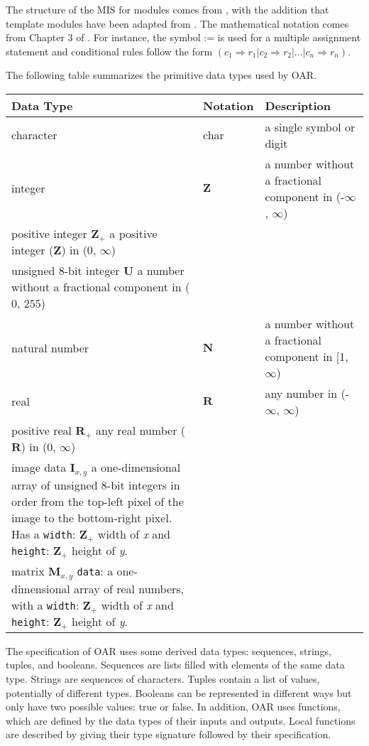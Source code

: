 \documentclass[12pt, titlepage]{article}
\def\code#1{\texttt{#1}}
\begin{document}

The structure of the MIS for modules comes from \citet{HoffmanAndStrooper1995},
with the addition that template modules have been adapted from
\cite{GhezziEtAl2003}.  The mathematical notation comes from Chapter 3 of
\citet{HoffmanAndStrooper1995}.  For instance, the symbol := is used for a
multiple assignment statement and conditional rules follow the form $(c_1
\Rightarrow r_1 | c_2 \Rightarrow r_2 | ... | c_n \Rightarrow r_n )$.

The following table summarizes the primitive data types used by OAR. 

\begin{center}
\renewcommand{\arraystretch}{1.2}
\noindent 
\begin{tabular}{l l p{7.5cm}} 
\toprule 
\textbf{Data Type} & \textbf{Notation} & \textbf{Description}\\ 
\midrule
character & char & a single symbol or digit\\
integer & $\mathbf{Z}$ & a number without a fractional component in (-$\infty$, $\infty$) \\
positive integer $\mathbf{Z}_{+}$ a positive integer ($\mathbf{Z}$) in ($0$, $\infty$) \\
unsigned 8-bit integer $\mathbf{U}$ a number without a fractional component in ($0$, $255$) \\
natural number & $\mathbf{N}$ & a number without a fractional component in [1, $\infty$) \\
real & $\mathbf{R}$ & any number in (-$\infty$, $\infty$)\\
positive real $\mathbf{R}_{+}$ any real number ($\mathbf{R}$) in ($0$, $\infty$) \\
image data $\mathbf{I}_{x,y}$ a one-dimensional array of unsigned 8-bit integers in order from the 
top-left pixel of the image to the bottom-right pixel. Has a \code{width}: $\mathbf{Z}_{+}$ width of \textit{x} and 
\code{height}: $\mathbf{Z}_{+}$ height of \textit{y}.\\
matrix $\mathbf{M}_{x,y}$ \code{data}: a one-dimensional array of real numbers, with a 
\code{width}: $\mathbf{Z}_{+}$ width of \textit{x} and \code{height}: $\mathbf{Z}_{+}$ height of \textit{y}.\\
\bottomrule
\end{tabular} 
\end{center}

\noindent
The specification of OAR uses some derived data types: sequences, strings,
tuples, and booleans. Sequences are lists filled with elements of the same data type. Strings
are sequences of characters. Tuples contain a list of values, potentially of
different types. Booleans can be represented in different ways but only have two possible values: true or false. In addition, 
OAR uses functions, which
are defined by the data types of their inputs and outputs. Local functions are
described by giving their type signature followed by their specification.
\end{document}
